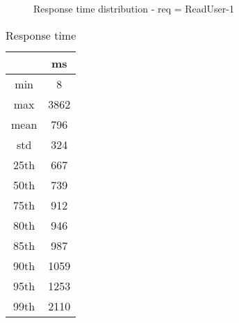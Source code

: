 \begin{minipage}{0.75\linewidth}
\begin{figure}[h]
\begin{adjustbox}{max width=1.0\linewidth, keepaspectratio}
  \end{adjustbox}
  \caption{Response time distribution - req = ReadUser-1}
\end{figure}
\end{minipage}\hfill\begin{minipage}{0.18\linewidth}
\begin{table}[h]
\begin{tabular}{|cc|}
\hline
\textbf{} & \textbf{ms}\\ \hline
 \Xhline{0.005\arrayrulewidth}
min & 8\\
 \Xhline{0.005\arrayrulewidth}
max & 3862\\
 \Xhline{0.005\arrayrulewidth}
mean & 796\\
 \Xhline{0.005\arrayrulewidth}
std & 324\\
\hline
\hline
 \Xhline{0.005\arrayrulewidth}
25th & 667\\
 \Xhline{0.005\arrayrulewidth}
50th & 739\\
 \Xhline{0.005\arrayrulewidth}
75th & 912\\
 \Xhline{0.005\arrayrulewidth}
80th & 946\\
 \Xhline{0.005\arrayrulewidth}
85th & 987\\
 \Xhline{0.005\arrayrulewidth}
90th & 1059\\
 \Xhline{0.005\arrayrulewidth}
95th & 1253\\
 \Xhline{0.005\arrayrulewidth}
99th & 2110\\
\hline
\end{tabular}
\caption{Response time}
\end{table}
\end{minipage}\hfill